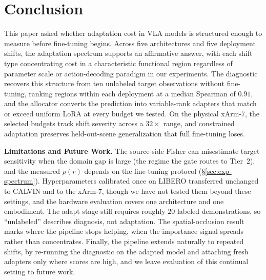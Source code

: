 \section{Conclusion}
\label{sec:conclusion}
This paper asked whether adaptation cost in VLA models is structured enough to measure before fine-tuning begins.
Across five architectures and five deployment shifts, the adaptation spectrum supports an affirmative answer, with each shift type concentrating cost in a characteristic functional region regardless of parameter scale or action-decoding paradigm in our experiments.
The diagnostic recovers this structure from ten unlabeled target observations without fine-tuning, ranking regions within each deployment at a median Spearman of $0.91$, and the allocator converts the prediction into variable-rank adapters that match or exceed uniform LoRA at every budget we tested.
On the physical xArm-7, the selected budgets track shift severity across a $32\times$ range, and constrained adaptation preserves held-out-scene generalization that full fine-tuning loses.

\textbf{Limitations and Future Work.}
The source-side Fisher can misestimate target sensitivity when the domain gap is large (the regime the gate routes to Tier~2), and the measured $\rho(r)$ depends on the fine-tuning protocol (\S\ref{sec:exp-spectrum}).
Hyperparameters calibrated once on LIBERO transferred unchanged to CALVIN and to the xArm-7, though we have not tested them beyond these settings, and the hardware evaluation covers one architecture and one embodiment.
The adapt stage still requires roughly $20$ labeled demonstrations, so ``unlabeled'' describes diagnosis, not adaptation.
The spatial-occlusion result marks where the pipeline stops helping, when the importance signal spreads rather than concentrates.
Finally, the pipeline extends naturally to repeated shifts, by re-running the diagnostic on the adapted model and attaching fresh adapters only where scores are high, and we leave evaluation of this continual setting to future work.